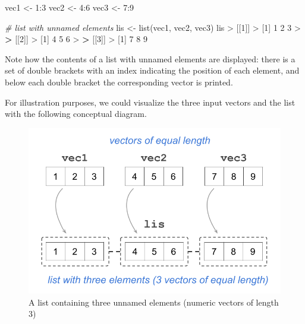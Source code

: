 \documentclass[
]{book}
\newenvironment{Shaded}{\begin{snugshade}}{\end{snugshade}}
\newcommand{\CommentTok}[1]{\textcolor[rgb]{0.56,0.35,0.01}{\textit{#1}}}
\newcommand{\DecValTok}[1]{\textcolor[rgb]{0.00,0.00,0.81}{#1}}
\newcommand{\ErrorTok}[1]{\textcolor[rgb]{0.64,0.00,0.00}{\textbf{#1}}}
\newcommand{\FunctionTok}[1]{\textcolor[rgb]{0.00,0.00,0.00}{#1}}
\newcommand{\NormalTok}[1]{#1}
\newcommand{\OtherTok}[1]{\textcolor[rgb]{0.56,0.35,0.01}{#1}}
\newcommand{\SpecialCharTok}[1]{\textcolor[rgb]{0.00,0.00,0.00}{#1}}
\begin{document}
\begin{Shaded}
\begin{Highlighting}[]
\NormalTok{vec1 }\OtherTok{\textless{}{-}} \DecValTok{1}\SpecialCharTok{:}\DecValTok{3}
\NormalTok{vec2 }\OtherTok{\textless{}{-}} \DecValTok{4}\SpecialCharTok{:}\DecValTok{6}
\NormalTok{vec3 }\OtherTok{\textless{}{-}} \DecValTok{7}\SpecialCharTok{:}\DecValTok{9}

\CommentTok{\# list with unnamed elements}
\NormalTok{lis }\OtherTok{\textless{}{-}} \FunctionTok{list}\NormalTok{(vec1, vec2, vec3)}
\NormalTok{lis}
\SpecialCharTok{\textgreater{}}\NormalTok{ [[}\DecValTok{1}\NormalTok{]]}
\SpecialCharTok{\textgreater{}}\NormalTok{ [}\DecValTok{1}\NormalTok{] }\DecValTok{1} \DecValTok{2} \DecValTok{3}
\SpecialCharTok{\textgreater{}} 
\ErrorTok{\textgreater{}}\NormalTok{ [[}\DecValTok{2}\NormalTok{]]}
\SpecialCharTok{\textgreater{}}\NormalTok{ [}\DecValTok{1}\NormalTok{] }\DecValTok{4} \DecValTok{5} \DecValTok{6}
\SpecialCharTok{\textgreater{}} 
\ErrorTok{\textgreater{}}\NormalTok{ [[}\DecValTok{3}\NormalTok{]]}
\SpecialCharTok{\textgreater{}}\NormalTok{ [}\DecValTok{1}\NormalTok{] }\DecValTok{7} \DecValTok{8} \DecValTok{9}
\end{Highlighting}
\end{Shaded}

Note how the contents of a list with unnamed elements are displayed: there is a
set of double brackets with an index indicating the position of each element,
and below each double bracket the corresponding vector is printed.

For illustration purposes, we could visualize the three input vectors and the
list with the following conceptual diagram.

\begin{figure}

{\centering \includegraphics[width=0.6\linewidth]{images/objects/obj-list-vectors1} 

}

\caption{A list containing three unnamed elements (numeric vectors of length 3)}\label{fig:unnamed-chunk-141}
\end{figure}
\end{document}
